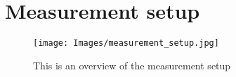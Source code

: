 \chapter{Measurement setup}

\begin{figure}
    \centering
    \texttt{[image: Images/measurement\_setup.jpg]}
    \caption{This is an overview of the measurement setup}
    \label{fig:measurement_setup}
\end{figure}

